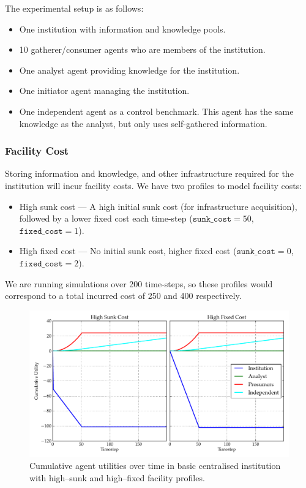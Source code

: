 The experimental setup is as follows:
\begin{itemize}
\item One institution with information and knowledge pools.
\item 10 gatherer/consumer agents who are members of the institution.
\item One analyst agent providing knowledge for the institution.
\item One initiator agent managing the institution.
\item One independent agent as a control benchmark. This agent has the same knowledge as the analyst, but only uses self-gathered information.
\end{itemize}

\subsubsection{Facility Cost}

Storing information and knowledge, and other infrastructure required for the institution will incur facility costs. We have two profiles to model facility costs:
\begin{itemize}
\item High sunk cost --- A high initial sunk cost (for infrastructure acquisition), followed by a lower fixed cost each time-step ($\mathtt{sunk\_cost}=50$, $\mathtt{fixed\_cost}=1$).
\item High fixed cost --- No initial sunk cost, higher fixed cost ($\mathtt{sunk\_cost}=0$, $\mathtt{fixed\_cost}=2$).
\end{itemize}

We are running simulations over 200 time-steps, so these profiles would correspond to a total incurred cost of 250 and 400 respectively.

\begin{figure}
\includegraphics[width=\linewidth]{gfx/kc/facility1v2.pdf} 
\caption{Cumulative agent utilities over time in basic centralised institution with high--sunk and high--fixed facility profiles.}\label{fig:facility1}
\end{figure}

